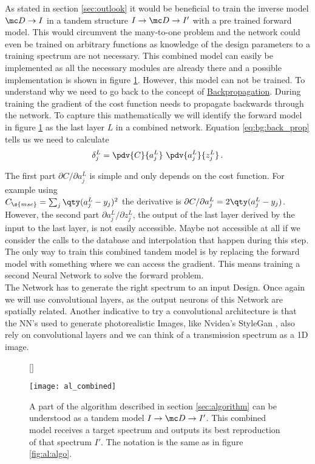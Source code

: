 As stated in section \ref{sec:outlook} it would be beneficial to train the inverse model $\mc D \rightarrow I$ in a tandem structure 
$I \rightarrow \mc D \rightarrow I'$ with a pre trained forward model.
This would circumvent the many-to-one problem and the network could even be trained on arbitrary functions as knowledge of the design parameters to a training spectrum are not necessary.
This combined model can easily be implemented as all the necessary modules are already there and a possible implementation is shown in figure \ref{fig:al:combined}.
However, this model can not be trained.
To understand why we need to go back to the concept of {\hyperref[eq:bg:back_prop]{Backpropagation}}.
During training the gradient of the cost function needs to propagate backwards through the network. To capture this mathematically we will identify the forward model in figure \ref{fig:al:combined} as the last layer $L$ in a combined network. Equation \eqref{eq:bg:back_prop} tells us we need to calculate
\begin{equation}
    \delta^L_j = \pdv{C}{a^L_j} \ \pdv{a^L_j}{z^L_j} \,.
\end{equation}

The first part $\partial C / \partial{a^L_j}$ is simple and only depends on the cost function. For example using \\
$C_\s{mse} = \sum_j \qty(a_j^L - y_j)^2$
the derivative is 
$\partial{C} / \partial{a^L_j} = 2 \qty(a_j^L - y_j)$.
However, the second part 
$\partial{a^L_j} / \partial{z^L_j}$,
the output of the last layer derived by the input to the last layer, is not easily accessible. Maybe not accessible at all if we consider the calls to the database and interpolation that happen during this step. The only way to train this combined tandem model is by replacing the forward model with something where we can access the gradient. This means training a second Neural Network to solve the forward problem.
\\

\indent
The Network has to generate the right spectrum to an input Design. Once again we will use convolutional layers, as the output neurons of this Network are spatially related. Another indicative to try a convolutional architecture is that the NN's used to generate photorealistic Images, like Nvidea's StyleGan \cite{Karras2018}, also rely on convolutional layers and we can think of a transmission spectrum as a 1D image.

\begin{figure}[H]
    [\FBwidth]
    {\caption{
        A part of the algorithm described in section \ref{sec:algorithm} can be understood as a tandem model 
        $I \rightarrow \mc D \rightarrow I'$.
        This combined model receives a target spectrum and outputs its best reproduction of that spectrum $I'$. The notation is the same as in figure \ref{fig:al:algo}.
    }
    \label{fig:al:combined}}
    {\texttt{[image: al\_combined]}}
\end{figure}

